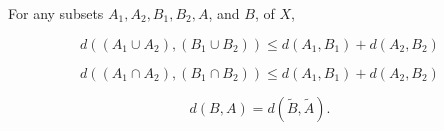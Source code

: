 For any subsets $A_1, A_2, B_1, B_2, A$, and $B$, of $X$,

$$d((A_1 \cup A_2), (B_1 \cup B_2)) \leq d(A_1, B_1) + d(A_2, B_2)$$

$$d((A_1 \cap A_2), (B_1 \cap B_2)) \leq d(A_1, B_1) + d(A_2, B_2)$$

$$d(B, A) = d(\tilde{B}, \tilde{A}).$$
